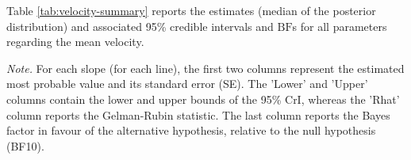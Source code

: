 \documentclass[
  11pt,
  english,
  ,doc,floatsintext]{apa6}
\newenvironment{lltable}{\begin{landscape}\centering\begin{ThreePartTable}}{\end{ThreePartTable}\end{landscape}}
\begin{document}
Table \ref{tab:velocity-summary} reports the estimates (median of the posterior distribution) and associated 95\% credible intervals and \(\text{BF}\)s for all parameters regarding the mean velocity.

\begin{lltable}

\begin{TableNotes}[para]
\normalsize{\textit{Note.} For each slope (for each line), the first two columns represent the
    estimated most probable value and its standard error (SE). The 'Lower' and
    'Upper' columns contain the lower and upper bounds of the 95\% CrI, whereas
    the 'Rhat' column reports the Gelman-Rubin statistic. The last column reports
    the Bayes factor in favour of the alternative hypothesis, relative to the
    null hypothesis (BF10).}
\end{TableNotes}

\scriptsize{

}
\end{lltable}
\end{document}
